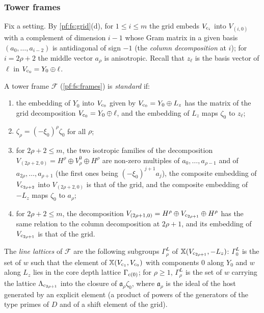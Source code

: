 \subsubsection{Tower frames}

Fix a setting. By \cref{pf:fs:grid}(d), for $1\le i\le m$ the grid embeds $V_{\mathrm{c}_i}$ into $V_{(i,0)}$ with a complement of dimension
$i-1$ whose Gram matrix in a given basis $(a_0,\dots,a_{i-2})$ is antidiagonal of sign $-1$ (the \emph{column decomposition} at $i$);
for $i=2\rho+2$ the middle vector $a_\rho$ is anisotropic. Recall that $z_\ell$ is the basis vector of $\ell$ in $V_{\mathrm{c}_0}=Y_0\oplus\ell$.

\begin{definition}\label{pf:fs:std}
A tower frame $\mathcal F$ (\cref{pf:fs:frames}) is \emph{standard} if:
\begin{enumerate}[label=(\alph*)]
\item the embedding of $Y_0$ into $V_{\mathrm{c}_0}$ given by $V_{\mathrm{c}_0}=Y_0\oplus L_z$ has the matrix of the grid decomposition
$V_{\mathrm{c}_0}=Y_0\oplus\ell$, and the embedding of $L_z$ maps $\zeta_0$ to $z_\ell$;
\item $\zeta_\rho=(-\xi_0)^\rho\zeta_0$ for all $\rho$;
\item for $2\rho+2\le m$, the two isotropic families of the decomposition $V_{(2\rho+2,0)}=H^\rho\oplus V^0_\rho\oplus H^\rho$ are non-zero
multiples of $a_0,\dots,a_{\rho-1}$ and of $a_{2\rho},\dots,a_{\rho+1}$ (the first ones being $(-\xi_0)^{j+1}a_j$), the composite embedding
of $V_{\mathrm{c}_{2\rho+2}}$ into $V_{(2\rho+2,0)}$ is that of the grid, and the composite embedding of $-L_z$ maps $\zeta_0$ to $a_\rho$;
\item for $2\rho+2\le m$, the decomposition $V_{(2\rho+1,0)}=H^\rho\oplus V_{\mathrm{c}_{2\rho+1}}\oplus H^\rho$ has the same relation to the column
decomposition at $2\rho+1$, and its embedding of $V_{\mathrm{c}_{2\rho+1}}$ is that of the grid.
\end{enumerate}
The \emph{line lattices} of $\mathcal F$ are the following subgroups $\Gamma^L_\rho$ of $\mathbb X(V_{\mathrm{c}_{2\rho+1}},-L_z)$: $\Gamma^L_0$ is the
set of $w$ such that the element of $\mathbb X(V_{\mathrm{c}_1},V_{\mathrm{c}_0})$ with components $0$ along $Y_0$ and $w$ along $L_z$ lies in the core depth
lattice $\Gamma_{\mathrm{c}(0)}$; for $\rho\ge1$, $\Gamma^L_\rho$ is the set of $w$ carrying the lattice $\Lambda_{\mathrm{c}_{2\rho+1}}$ into the closure of
$\mathfrak a_\rho\zeta_0$, where $\mathfrak a_\rho$ is the ideal of the host generated by an explicit element (a product of powers of the
generators of the type primes of $D$ and of a shift element of the grid).
\end{definition}


